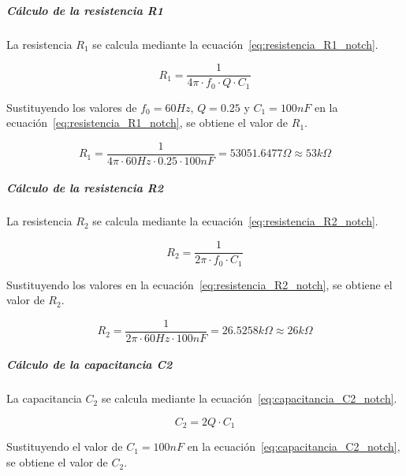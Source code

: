                 \subparagraph{Cálculo de la resistencia R1}
                    La resistencia $R_1$ se calcula mediante la ecuación~\ref{eq:resistencia_R1_notch}.

                    \begin{equation}
                        \label{eq:resistencia_R1_notch}
                        R_1 = \frac{1}{4\pi \cdot f_0 \cdot Q \cdot C_1}
                    \end{equation}

                    Sustituyendo los valores de $f_0 = 60 Hz$, $Q = 0.25$ y $C_1 = 100 nF$ en la ecuación~\ref{eq:resistencia_R1_notch}, se obtiene el valor de $R_1$.

                    \begin{equation}
                        R_1 = \frac{1}{4\pi \cdot 60 Hz \cdot 0.25 \cdot 100 nF} = 53051.6477 \Omega \approx 53 k\Omega
                    \end{equation}

                \subparagraph{Cálculo de la resistencia R2}
                    La resistencia $R_2$ se calcula mediante la ecuación~\ref{eq:resistencia_R2_notch}.

                    \begin{equation}
                        \label{eq:resistencia_R2_notch}
                        R_2 = \frac{1}{2\pi \cdot f_0 \cdot C_1}
                    \end{equation}

                    Sustituyendo los valores en la ecuación~\ref{eq:resistencia_R2_notch}, se obtiene el valor de $R_2$.

                    \begin{equation}
                        R_2 = \frac{1}{2\pi \cdot 60 Hz \cdot 100 nF} = 26.5258 k\Omega \approx 26 k\Omega
                    \end{equation}

                \subparagraph{Cálculo de la capacitancia C2}
                    La capacitancia $C_2$ se calcula mediante la ecuación~\ref{eq:capacitancia_C2_notch}.

                    \begin{equation}
                        \label{eq:capacitancia_C2_notch}
                        C_2 = 2Q \cdot C_1
                    \end{equation}

                    Sustituyendo el valor de $C_1 = 100 nF$ en la ecuación~\ref{eq:capacitancia_C2_notch}, se obtiene el valor de $C_2$.

